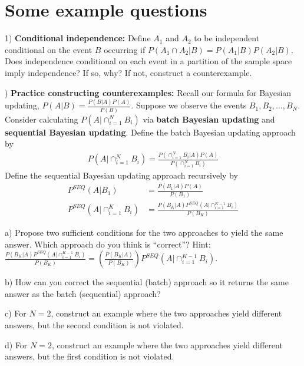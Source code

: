 \documentclass[12pt,english]{article}
\begin{document}
\section{Some example questions}

1) \textbf{Conditional independence:} Define $A_{1}$ and $A_{2}$ to be independent conditional on the event $B$ occurring if $P(A_{1} \cap A_{2} | B) = P(A_{1} | B) P(A_{2} | B)$. Does independence conditional on each event in a partition of the sample space imply independence? If so, why? If not, construct a counterexample.

\vspace{1em}
) \textbf{Practice constructing counterexamples:} Recall our formula for Bayesian updating, $P(A | B) = \frac{P(B | A) P(A)}{P(B)}$. Suppose we observe the events $B_{1}, B_{2}, \ldots, B_{N}$. Consider calculating $P(A | \cap_{i = 1}^{N} B_{i})$ via \textbf{batch Bayesian updating} and \textbf{sequential Bayesian updating}. Define the batch Bayesian updating approach by
\begin{align*}
P(A | \cap_{i = 1}^{N} B_{i}) = \frac{P(\cap_{i = 1}^{N} B_{i} | A) P(A)}{P(\cap_{i = 1}^{N} B_{i})}
\end{align*}
Define the sequential Bayesian updating approach recursively by
\begin{align*}
P^{SEQ}(A | B_{1}) & = \frac{P(B_{1} | A) P(A)}{P(B_{1})} \\
P^{SEQ}(A | \cap_{i = 1}^{K} B_{i}) & = \frac{P(B_{K} | A) P^{SEQ}(A | \cap_{i = 1}^{K - 1} B_{i})}{P(B_{K})}
\end{align*}

a) Propose two sufficient conditions for the two approaches to yield the same answer. Which approach do you think is ``correct''? Hint: $\frac{P(B_{K} | A) P^{SEQ}(A | \cap_{i = 1}^{K - 1} B_{i})}{P(B_{K})} = \left( \frac{P(B_{K} | A)}{P(B_{K})} \right) P^{SEQ}(A | \cap_{i = 1}^{K - 1} B_{i})$.

b) How can you correct the sequential (batch) approach so it returns the same answer as the batch (sequential) approach?

c) For $N = 2$, construct an example where the two approaches yield different answers, but the second condition is not violated.

d) For $N = 2$, construct an example where the two approaches yield different answers, but the first condition is not violated.
\end{document}

